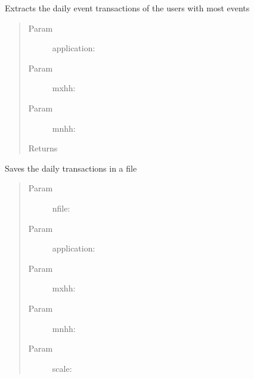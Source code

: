 \documentclass[letterpaper,10pt,english]{sphinxmanual}
\begin{document}

\begin{fulllineitems}
\label{index:SuperHubTransactions.dailyTransactions}
Extracts the daily event transactions of the users with most events
\begin{quote}\begin{description}
\item[{Param }] \leavevmode
application:

\item[{Param }] \leavevmode
mxhh:

\item[{Param }] \leavevmode
mnhh:

\item[{Returns}] \leavevmode


\end{description}\end{quote}

\end{fulllineitems}


\begin{fulllineitems}
\label{index:SuperHubTransactions.saveDailyTransactions}
Saves the daily transactions in a file
\begin{quote}\begin{description}
\item[{Param }] \leavevmode
nfile:

\item[{Param }] \leavevmode
application:

\item[{Param }] \leavevmode
mxhh:

\item[{Param }] \leavevmode
mnhh:

\item[{Param }] \leavevmode
scale:

\end{description}\end{quote}

\end{fulllineitems}
\end{document}
